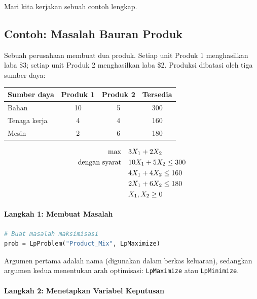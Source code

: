 Mari kita kerjakan sebuah contoh lengkap.

\subsection{Contoh: Masalah Bauran Produk}
\label{sec:pulp-product-mix}

Sebuah perusahaan membuat dua produk. Setiap unit Produk 1 menghasilkan laba \$3; setiap unit Produk 2 menghasilkan laba \$2. Produksi dibatasi oleh tiga sumber daya:

\begin{center}
\begin{tabular}{lccc}
\toprule
Sumber daya & Produk 1 & Produk 2 & Tersedia \\
\midrule
Bahan & 10 & 5 & 300 \\
Tenaga kerja & 4 & 4 & 160 \\
Mesin & 2 & 6 & 180 \\
\bottomrule
\end{tabular}
\par{}\label{tab:software-python-book1-tab01}%

\end{center}

\begin{align*}
\max \quad & 3X_1 + 2X_2 \\
\mbox{dengan syarat}\quad        & 10X_1 + 5X_2 \leq 300 \\
& 4X_1 + 4X_2 \leq 160 \\
& 2X_1 + 6X_2 \leq 180 \\
& X_1, X_2 \geq 0
\end{align*}

\paragraph{Langkah 1: Membuat Masalah}

\begin{lstlisting}[language=Python]
# Buat masalah maksimisasi
prob = LpProblem("Product_Mix", LpMaximize)
\end{lstlisting}

Argumen pertama adalah nama (digunakan dalam berkas keluaran), sedangkan argumen kedua menentukan arah optimisasi: \texttt{LpMaximize} atau \texttt{LpMinimize}.

\paragraph{Langkah 2: Menetapkan Variabel Keputusan}

